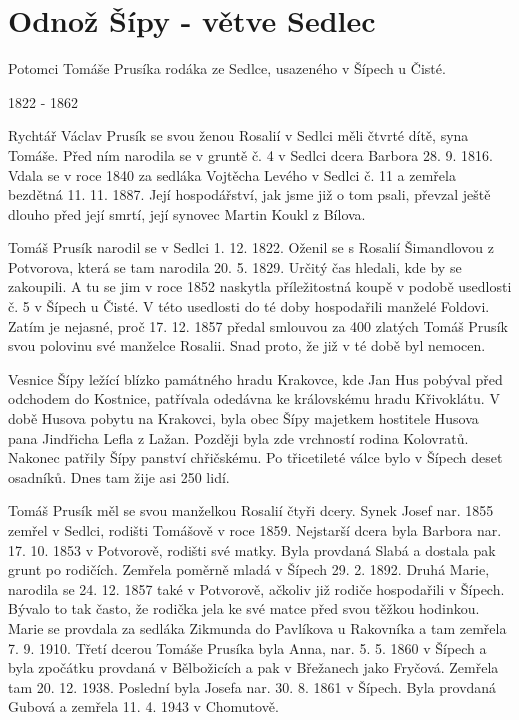 \documentclass[../dejiny-rodu-prusiku.tex]{subfiles}
\begin{document}
\section{Odnož Šípy - větve Sedlec}

Potomci Tomáše Prusíka rodáka ze Sedlce, usazeného v Šípech u Čisté.

1822 - 1862

Rychtář Václav Prusík se svou ženou Rosalií v Sedlci měli čtvrté dítě, syna Tomáše. Před ním narodila se v gruntě č. 4 v Sedlci dcera Barbora 28. 9. 1816. Vdala se v roce 1840 za sedláka Vojtěcha Levého v Sedlci č. 11 a zemřela bezdětná 11. 11. 1887. Její hospodářství, jak jsme již o tom psali, převzal ještě dlouho před její smrtí, její synovec Martin Koukl z Bílova.

Tomáš Prusík narodil se v Sedlci 1. 12. 1822. Oženil se s Rosalií Šimandlovou z Potvorova, která se tam naro­dila 20. 5. 1829. Určitý čas hledali, kde by se zakoupi­li. A tu se jim v roce 1852 naskytla příležitostná kou­pě v podobě usedlosti č. 5 v Šípech u Čisté. V této usedlosti do té doby hospodařili manželé Foldovi. Zatím je nejasné, proč 17. 12. 1857 předal smlouvou za 400 zla­tých Tomáš Prusík svou polovinu své manželce Rosalii. Snad proto, že již v té době byl nemocen.

Vesnice Šípy ležící blízko památného hradu Krakovce, kde Jan Hus pobýval před odchodem do Kostnice, patřívala odedávna ke královskému hradu Křivoklátu. V době Husova pobytu na Krakovci, byla obec Šípy majetkem hostitele Husova pana Jindřicha Lefla z Lažan. Později byla zde vrchností rodina Kolovratů. Nakonec patřily Šípy panství chřičskému. Po třicetileté válce bylo v Šípech deset osadníků. Dnes tam žije asi 250 lidí.

Tomáš Prusík měl se svou manželkou Rosalií čtyři dcery. Synek Josef nar. 1855 zemřel v Sedlci, rodišti Tomášově v roce 1859. Nejstarší dcera byla Barbora nar. 17. 10. 1853 v Potvorově, rodišti své matky. Byla provdaná Slabá a dostala pak grunt po rodičích. Zemřela poměrně mla­dá v Šípech 29. 2. 1892. Druhá Marie, narodila se 24. 12. 1857 také v Potvorově, ačkoliv již rodiče hospodařili v Šípech. Bývalo to tak často, že rodička jela ke své mat­ce před svou těžkou hodinkou. Marie se provdala za sedláka Zikmunda do Pavlíkova u Rakovníka a tam zemřela 7. 9. 1910. Třetí dcerou Tomáše Prusíka byla Anna, nar. 5. 5. 1860 v Šípech a byla zpočátku provdaná v Bělbožicích a pak v Břežanech jako Fryčová. Zemřela tam 20. 12. 1938. Poslední byla Josefa nar. 30. 8. 1861 v Šípech. Byla provdaná Gubová a zemřela 11. 4. 1943 v Chomutově.
\end{document}
